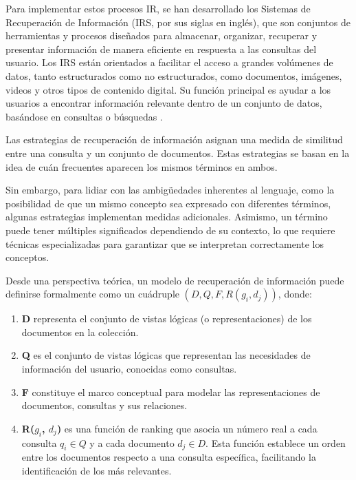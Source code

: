Para implementar estos procesos IR, se han desarrollado los Sistemas de Recuperación 
de Información (IRS, por sus siglas en inglés), que son conjuntos de herramientas 
y procesos diseñados para almacenar, organizar, recuperar y presentar información 
de manera eficiente en respuesta a las consultas del usuario. Los IRS están orientados 
a facilitar el acceso a grandes volúmenes de datos, tanto estructurados como no estructurados, 
como documentos, imágenes, videos y otros tipos de contenido digital. Su función principal 
es ayudar a los usuarios a encontrar información relevante dentro de un conjunto de datos, 
basándose en consultas o búsquedas \cite{Ceri2013}.

Las estrategias de recuperación de información asignan una medida de similitud 
entre una consulta y un conjunto de documentos. Estas estrategias se basan en 
la idea de cuán frecuentes aparecen los mismos términos en ambos.

Sin embargo, para lidiar con las ambigüedades inherentes al lenguaje, como la 
posibilidad de que un mismo concepto sea expresado con diferentes términos, 
algunas estrategias implementan medidas adicionales. Asimismo, un término puede 
tener múltiples significados dependiendo de su contexto, lo que requiere técnicas 
especializadas para garantizar que se interpretan correctamente los conceptos.

Desde una perspectiva teórica, un modelo de recuperación de información puede definirse 
formalmente \cite{BaezaDefinition} como un cuádruple $(D, Q, F, R(g_i, d_j))$, donde:

\begin{enumerate}
    \item \textbf{D} representa el conjunto de vistas lógicas (o representaciones) de los 
    documentos en la colección.
    \item \textbf{Q} es el conjunto de vistas lógicas que representan las necesidades de información 
    del usuario, conocidas como consultas.
    \item \textbf{F} constituye el marco conceptual para modelar las representaciones de documentos, 
    consultas y sus relaciones.
    \item \textbf{R($g_i$, $d_j$)} es una función de ranking que asocia un número real a cada 
    consulta $q_i \in Q$ y a cada documento $d_j \in D$. Esta función establece un orden entre 
    los documentos respecto a una consulta específica, facilitando la identificación de los más 
    relevantes.
\end{enumerate}

